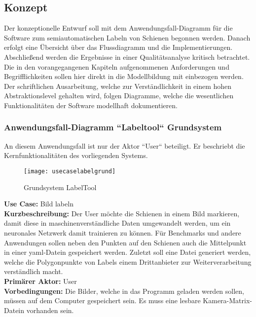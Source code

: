 
\subsection{Konzept}
\label{sec:Konzept}

Der konzeptionelle Entwurf soll mit dem Anwendungsfall-Diagramm für die Software zum semiautomatischen Labeln von Schienen begonnen werden. Danach erfolgt eine Übersicht über das Flussdiagramm und die Implementierungen. Abschließend werden die Ergebnisse in einer Qualitätsanalyse kritisch betrachtet. Die in den vorangegangenen Kapiteln aufgenommenen Anforderungen und Begrifflichkeiten sollen hier direkt in die Modellbildung mit einbezogen werden. Der schriftlichen Ausarbeitung, welche zur Verständlichkeit in einem hohen Abstraktionslevel gehalten wird, folgen Diagramme, welche die wesentlichen Funktionalitäten der Software modellhaft dokumentieren.

\subsubsection{Anwendungsfall-Diagramm ``Labeltool`` Grundsystem}
\label{sec:Anwendungsfall-Diagramm ``Labeltool`` Grundsystem}
An diesem Anwendungsfall ist nur der Aktor ``User`` beteiligt. Er beschriebt die Kernfunktionalitäten des vorliegenden Systems.

\begin{figure}[H]
  \texttt{[image: usecaselabelgrund]}
  \caption{Grundsystem LabelTool}
\end{figure}

\noindent
\textbf{Use Case:} Bild labeln
\\ 

\noindent
\textbf{Kurzbeschreibung:} Der User möchte die Schienen in einem Bild markieren, damit diese in maschinenverständliche Daten umgewandelt werden, um ein neuronales Netzwerk damit trainieren zu können. Für Benchmarks und andere Anwendungen sollen neben den Punkten auf den Schienen auch die Mittelpunkt in einer yaml-Datein gespeichert werden. Zuletzt soll eine Datei generiert werden, welche die Polygonpunkte von Labels einem Drittanbieter zur Weiterverarbeitung verständlich macht.
\\ 

\noindent
\textbf{Primärer Aktor:} User
\\ 

\noindent
\textbf{Vorbedingungen:} Die Bilder, welche in das Programm geladen werden sollen, müssen auf dem Computer gespeichert sein. Es muss eine lesbare Kamera-Matrix-Datein vorhanden sein. 
\\ 

